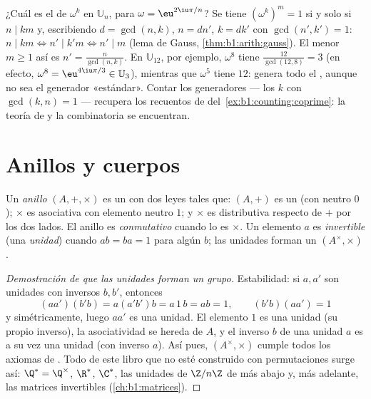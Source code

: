 \begin{example}\label{ex:b1:structures:orderU12}
¿Cuál es el  de $\omega^k$ en $\mathbb U_n$, para $\omega =
\eu^{2\iu\pi/n}$? Se tiene $(\omega^k)^m = 1$ si y solo si $n \mid km$
y, escribiendo $d = \gcd(n, k)$, $n = dn'$, $k = dk'$ con
$\gcd(n', k') = 1$: $n \mid km \iff n' \mid k'm \iff n' \mid m$ (lema
de Gauss, \cref{thm:b1:arith:gauss}). El menor $m \geq 1$ así es
$n' = \frac{n}{\gcd(n,k)}$. En $\mathbb U_{12}$, por ejemplo,
$\omega^8$ tiene  $\frac{12}{\gcd(12,8)} = 3$ (en efecto,
$\omega^8 = \eu^{4\iu\pi/3} \in \mathbb U_3$), mientras que $\omega^5$
tiene  $12$: genera todo el , aunque no sea el generador
«estándar». Contar los generadores --- los $k$ con $\gcd(k, n) = 1$ ---
recupera los recuentos de  del~\cref{ex:b1:counting:coprime}:
la teoría de  y la combinatoria se encuentran.
\end{example}

\section{Anillos y cuerpos}

\begin{definition}[Anillo]\label{def:b1:structures:ring}
Un \emph{anillo} $(A, +, \times)$ es un  con dos
leyes tales que: $(A, +)$ es un  (con neutro $0$);
$\times$ es asociativa con elemento neutro $1$; y $\times$ es
distributiva respecto de $+$ por los dos lados. El anillo es
\emph{conmutativo} cuando lo es $\times$. Un elemento $a$ es
\emph{invertible} (una \emph{unidad}) cuando $ab = ba = 1$ para algún
$b$; las unidades forman un  $(A^\times, \times)$.
\end{definition}

\begin{proof}[Demostración de que las unidades forman un grupo]
Estabilidad: si $a, a'$ son unidades con inversos $b, b'$, entonces
\[
(aa')(b'b) = a(a'b')b = a\,1\,b = ab = 1,
\qquad (b'b)(aa') = 1
\]
y simétricamente, luego $aa'$ es una unidad. El elemento $1$ es una
unidad (su propio inverso), la asociatividad se hereda de $A$, y el
inverso $b$ de una unidad $a$ es a su vez una unidad (con inverso $a$).
Así pues, $(A^\times, \times)$ cumple todos los axiomas de . Todo
 de este libro que no esté construido con permutaciones surge
así: $\Q^* = \Q^\times$, $\R^*$, $\C^*$, las unidades de $\Z/n\Z$ de
más abajo y, más adelante, las matrices invertibles (\cref{ch:b1:matrices}).
\end{proof}

